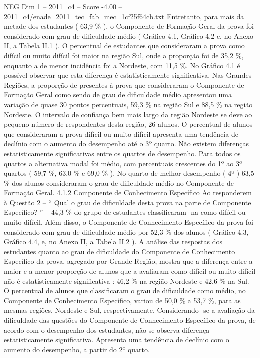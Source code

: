 \begin{textsample}{NEG Dim 1 – 2011\_c4 – Score -4.00 – 2011\_c4/enade\_2011\_tec\_fab\_mec\_1cf25f64cb.txt}
Entretanto, para mais da metade dos estudantes ( 63,9 \% ), o Componente de Formação Geral da prova foi considerado com grau de dificuldade médio ( Gráfico 4.1, Gráfico 4.2 e, no Anexo II, a Tabela II.1 ).
O percentual de estudantes que consideraram a prova como difícil ou muito difícil foi maior na região Sul, onde a proporção foi de 35,2 \%, enquanto a de menor incidência foi a Nordeste, com 11,5 \%.
No Gráfico 4.1 é possível observar que esta diferença é estatisticamente significativa.
Nas Grandes Regiões, a proporção de presentes à prova que consideraram o Componente de Formação Geral como sendo de grau de dificuldade médio apresentou uma variação de quase 30 pontos percentuais, 59,3 \% na região Sul e 88,5 \% na região Nordeste.
O intervalo de confiança bem mais largo da região Nordeste se deve ao pequeno número de respondentes desta região, 26 alunos.
O percentual de alunos que consideraram a prova difícil ou muito difícil apresenta uma tendência de declínio com o aumento do desempenho até o 3º quarto.
Não existem diferenças estatisticamente significativas entre os quartos de desempenho.
Para todos os quartos a alternativa modal foi médio, com percentuais crescentes do 1º ao 3º quartos ( 59,7 \%, 63,0 \% e 69,0 \% ).
No quarto de melhor desempenho ( 4º ) 63,5 \% dos alunos consideraram o grau de dificuldade médio no Componente de Formação Geral. 4.1.2 Componente de Conhecimento Específico Ao responderem à Questão 2 – “ Qual o grau de dificuldade desta prova na parte de Componente Específico? ” – 44,3 \% do grupo de estudantes classificaram -na como difícil ou muito difícil.
Além disso, o Componente de Conhecimento Específico da prova foi considerado com grau de dificuldade médio por 52,3 \% dos alunos ( Gráfico 4.3, Gráfico 4.4, e, no Anexo II, a Tabela II.2 ).
A análise das respostas dos estudantes quanto ao grau de dificuldade do Componente de Conhecimento Específico da prova, agregado por Grande Região, mostra que a diferença entre a maior e a menor proporção de alunos que a avaliaram como difícil ou muito difícil não é estatisticamente significativa : 46,2 \% na região Nordeste e 42,6 \% na Sul.
O percentual de alunos que classificaram o grau de dificuldade como médio, no Componente de Conhecimento Específico, variou de 50,0 \% a 53,7 \%, para as mesmas regiões, Nordeste e Sul, respectivamente.
Considerando -se a avaliação da dificuldade das questões do Componente de Conhecimento Específico da prova, de acordo com o desempenho dos estudantes, não se observa diferença estatisticamente significativa.
Apresenta uma tendência de declínio com o aumento do desempenho, a partir do 2º quarto.

\end{textsample}
